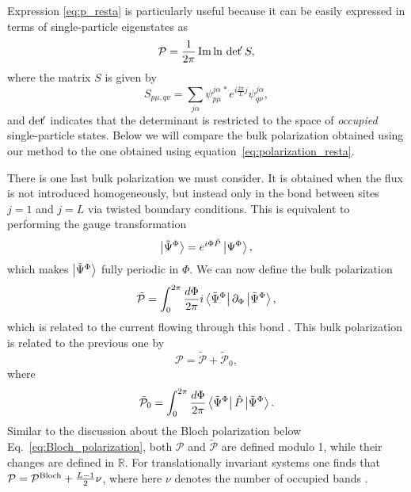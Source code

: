 \documentclass[twocolumn,amsmath,longbibliography,amssymb,superscriptaddress]{revtex4-1}
\begin{document}
Expression \eqref{eq:p_resta} is particularly useful because it can be easily expressed in terms of single-particle eigenstates as
\begin{align}
\mathcal{P} = \frac{1}{2\pi}\Im \ln \, {\rm det }\!' \, S,
\label{eq:polarization_resta}
\end{align}
where the matrix $S$ is given by
\begin{equation}
S_{p\mu,q\nu} = \sum_{j\alpha} \psi_{p\mu}^{j \alpha \, \ast} e^{i\frac{2\pi}{L}j}\psi_{q\nu}^{j \alpha},
\end{equation}
and  ${\rm det }\!' $ indicates that the determinant is restricted to the space of \emph{occupied} single-particle states. Below we will compare the bulk polarization obtained using our method to the one obtained using equation~\eqref{eq:polarization_resta}.

There is one last bulk polarization we must consider. 
It is obtained when the flux is not introduced homogeneously, but instead only in the bond between sites $j=1$ and $j=L$ via twisted boundary conditions. This is equivalent to performing the gauge transformation
\begin{align}\label{eq:Psi_tilde}
\ket{\tilde{\Psi}^\Phi}=e^{i\Phi \hat{P}}\ket{\Psi^\Phi},
\end{align}
which makes $\ket{\tilde{\Psi}^\Phi}$ fully periodic in $\Phi$. We can now define the bulk polarization
\begin{equation}
\tilde{\mathcal{P}} = \int_0^{2\pi}\frac{d\Phi}{2\pi} i\bra{\tilde{\Psi}^\Phi}\partial_\Phi \ket{\tilde{\Psi}^\Phi},
\label{eq:p_tilde}
\end{equation}
which is related to the current flowing through this bond \cite{Watanabe2018}. This bulk polarization is related to the previous one by 
\begin{equation}
\mathcal{P}= \tilde{\mathcal{P}}+\tilde{\mathcal{P}}_0,
\end{equation} 
where
\begin{equation}
\tilde {\mathcal{P}}_0= \int_0^{2\pi}\frac{d\Phi}{2\pi} \bra{\tilde{\Psi}^\Phi}\hat{P}\ket{\tilde{\Psi}^\Phi}.
\end{equation} 
Similar to the discussion about the Bloch polarization below Eq.~\eqref{eq:Bloch_polarization}, both $\mathcal{P}$ and $\tilde{\mathcal{P}}$ are defined modulo 1, while their changes are defined in $\mathbb{R}$. For translationally invariant systems one finds that $\mathcal{P} = \mathcal{P}^{\rm Bloch}+\frac{L-1}{2}\nu$, where here $\nu$ denotes the number of occupied bands \cite{Watanabe2018}. 
\end{document}
